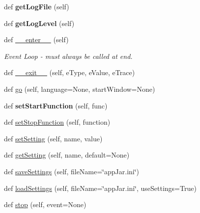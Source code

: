 \begin{DoxyCompactItemize}
\item 
\mbox{\label{class_python_01_g_u_i_1_1appjar_1_1gui_aca1a94b75997e51ad0de50025ad9b5e8}} 
def {\bfseries get\+Log\+File} (self)
\item 
\mbox{\label{class_python_01_g_u_i_1_1appjar_1_1gui_ad5b90b4e88f852f8a2e5fb333be4dea2}} 
def {\bfseries get\+Log\+Level} (self)
\item 
def \hyperlink{class_python_01_g_u_i_1_1appjar_1_1gui_a45970d4455a57ab7d4dc44f26cb90502}{\+\_\+\+\_\+enter\+\_\+\+\_\+} (self)
\begin{DoxyCompactList}\small\item\em Event Loop -\/ must always be called at end. \end{DoxyCompactList}\item 
def \hyperlink{class_python_01_g_u_i_1_1appjar_1_1gui_a73cce8684dfecccd7dc3c68abd7cc8ae}{\+\_\+\+\_\+exit\+\_\+\+\_\+} (self, e\+Type, e\+Value, e\+Trace)
\item 
def \hyperlink{class_python_01_g_u_i_1_1appjar_1_1gui_afff774610125f6dad20e8df091a9aa19}{go} (self, language=None, start\+Window=None)
\item 
\mbox{\label{class_python_01_g_u_i_1_1appjar_1_1gui_aebfc9b2d4a53efe9352febe60fe3ba35}} 
def {\bfseries set\+Start\+Function} (self, func)
\item 
def \hyperlink{class_python_01_g_u_i_1_1appjar_1_1gui_a9043d338e205f8bdeba96beb8ff76b7f}{set\+Stop\+Function} (self, function)
\item 
def \hyperlink{class_python_01_g_u_i_1_1appjar_1_1gui_a7543a75bb0bb8aee2dfe59bd800c39cc}{set\+Setting} (self, name, value)
\item 
def \hyperlink{class_python_01_g_u_i_1_1appjar_1_1gui_a5777b9d316d378fe03f27668be389de1}{get\+Setting} (self, name, default=None)
\item 
def \hyperlink{class_python_01_g_u_i_1_1appjar_1_1gui_a137411361931260f10d73b09d061d47d}{save\+Settings} (self, file\+Name=\char`\"{}app\+Jar.\+ini\char`\"{})
\item 
def \hyperlink{class_python_01_g_u_i_1_1appjar_1_1gui_a22f0678a46f3eb1bf27a78562425d275}{load\+Settings} (self, file\+Name=\char`\"{}app\+Jar.\+ini\char`\"{}, use\+Settings=True)
\item 
def \hyperlink{class_python_01_g_u_i_1_1appjar_1_1gui_a09fd0d3197efd74785125a04344eac6d}{stop} (self, event=None)

\end{DoxyCompactItemize}
